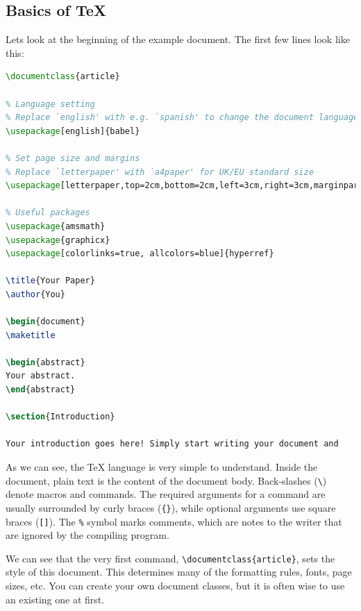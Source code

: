 \documentclass{article}
\begin{document}
\subsection{Basics of \TeX{}}
Lets look at the beginning of the example document. The first few lines look like this:
\begin{lstlisting}[language=TeX]
\documentclass{article}

% Language setting
% Replace `english' with e.g. `spanish' to change the document language
\usepackage[english]{babel}

% Set page size and margins
% Replace `letterpaper' with `a4paper' for UK/EU standard size
\usepackage[letterpaper,top=2cm,bottom=2cm,left=3cm,right=3cm,marginparwidth=1.75cm]{geometry}

% Useful packages
\usepackage{amsmath}
\usepackage{graphicx}
\usepackage[colorlinks=true, allcolors=blue]{hyperref}

\title{Your Paper}
\author{You}

\begin{document}
\maketitle

\begin{abstract}
Your abstract.
\end{abstract}

\section{Introduction}

Your introduction goes here! Simply start writing your document and
\end{lstlisting}
As we can see, the \TeX{} language is very simple to understand. Inside the document, plain text is the content of the document body. Back-slashes (\verb|\|) denote macros and commands. The required arguments for a command are usually surrounded by curly braces (\verb|{}|), while optional arguments use square braces (\verb|[]|). The \verb|%| symbol marks comments, which are notes to the writer that are ignored by the compiling program.

We can see that the very first command, \verb|\documentclass{article}|, sets the style of this document. This determines many of the formatting rules, fonts, page sizes, etc. You can create your own document classes, but it is often wise to use an existing one at first.
\end{document}
